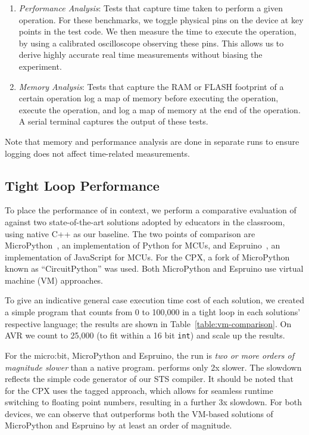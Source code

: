 \begin{enumerate}
    \item \textit{Performance Analysis}: Tests that capture time taken to perform a given operation. For these benchmarks, we toggle physical pins on the device at key points in
    the test code. We then measure the time to
   execute the operation, by using a calibrated oscilloscope observing these pins. This allows us to derive highly accurate real time
   measurements without biasing the experiment.

    \item \textit{Memory Analysis}: Tests that capture the RAM or FLASH footprint of a certain operation log a map of memory
    before executing the operation, execute the operation, and log a map of memory at the end of the operation.
    A serial terminal captures the output of these tests.
\end{enumerate}

Note that memory and performance analysis are done in separate runs
to ensure logging does not affect time-related measurements.

\subsection{Tight Loop Performance}

To place the performance of \MC in context, we perform a comparative evaluation of \MC against two state-of-the-art
solutions adopted by educators in the classroom, using native C++ as our baseline. The two points of comparison are MicroPython~\cite{MicroPython}, an implementation of Python for MCUs, and Espruino~\cite{espruinoBook}, an implementation of JavaScript for MCUs. For the CPX, a fork of MicroPython known as ``CircuitPython'' was used. Both MicroPython and Espruino use virtual machine (VM) approaches.

To give an indicative general case execution time cost of each solution, we created a simple program that counts from 0 to 100,000 in a tight loop in each solutions' respective language; the results are shown in Table~\ref{table:vm-comparison}. On AVR we count to 25,000 (to fit within a 16 bit \texttt{int}) and scale up the results.

For the micro:bit, MicroPython and Espruino, the run is \emph{two or more orders of magnitude slower} than a native \CO program.
\MC performs only 2x slower. The slowdown reflects the simple code generator of our STS compiler. It should be noted that \MC for the CPX uses the tagged approach, which allows for seamless runtime switching to floating point numbers, resulting in a further 3x slowdown. For both devices, we can observe that \MC outperforms both the VM-based solutions of MicroPython and Espruino by at least an order of magnitude.

